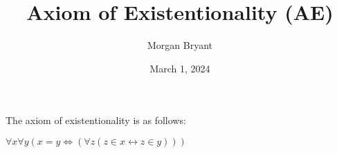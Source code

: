 \documentclass[a4paper]{article}
\title{Axiom of Existentionality (AE)}
\date{March 1, 2024}
\author{Morgan Bryant}
\begin{document}
\maketitle
\par{The axiom of existentionality is as follows:}\par{\(\forall  x  \forall  y( x = y  \Leftrightarrow  ( \forall  z (z \in  x  \leftrightarrow  z \in  y)))\)}
\printbibliography
\end{document}
